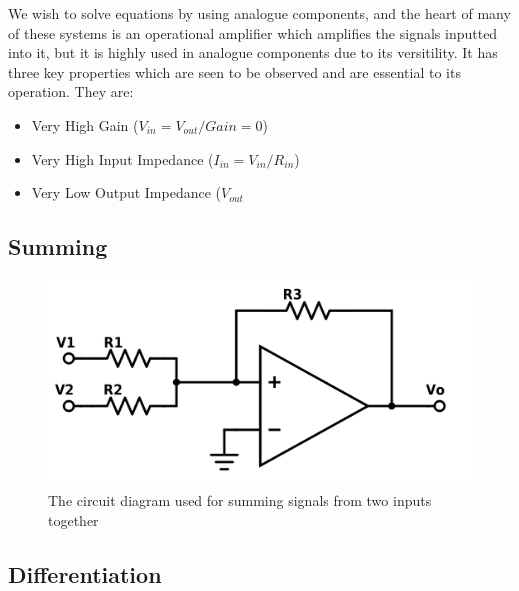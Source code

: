 We wish to solve equations by using analogue components, and the heart of many of these systems is an operational amplifier which amplifies the signals inputted into it, but it is highly used in analogue components due to its versitility. It has three key properties which are seen to be observed and are essential to its operation. They are:

\begin{itemize}
  \item Very High Gain ($V_{in} = V_{out}/Gain = 0$)
  \item Very High Input Impedance ($I_{in} = V_{in}/ R_{in}$)
  \item Very Low Output Impedance ($V_{out}$
\end{itemize}


\subsection{Summing}

\begin{figure}[ht!]
\centering
\includegraphics[scale=.15]{figures/460-17-1-Summer.png}
\caption{The circuit diagram used for summing signals from two inputs together}
\label{fig:CD_Sum}
\end{figure}


\subsection{Differentiation}


